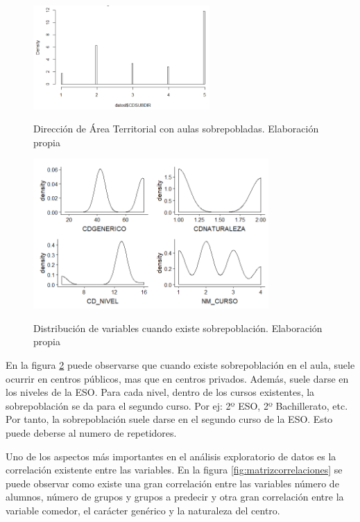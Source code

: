 \begin{figure}[htb]
	\centering
	\caption{Dirección de Área Territorial con aulas sobrepobladas. Elaboración propia}
	\includegraphics[width=0.6\textwidth]{recursos/ImagenesR/histDat}
	\label{fig:histDat}
\end{figure}
\FloatBarrier

\begin{figure}[htb]
	\centering
	\caption{Distribución de variables cuando existe sobrepoblación. Elaboración propia}
	\includegraphics[width=0.8\textwidth]{recursos/ImagenesR/DistSobrepoblacion}
	\label{fig:DistSobrepoblacion}
\end{figure}
\FloatBarrier

En la figura \ref{fig:DistSobrepoblacion} puede observarse que cuando existe sobrepoblación en el aula, suele ocurrir en centros públicos, mas que en centros privados. Además, suele darse en los niveles de la ESO. Para cada nivel, dentro de los cursos existentes, la sobrepoblación se da para el segundo curso. Por ej: 2º ESO, 2º Bachillerato, etc. Por tanto, la sobrepoblación suele darse en el segundo curso de la ESO. Esto puede deberse al numero de repetidores.

Uno de los aspectos más importantes en el análisis exploratorio de datos es la correlación existente entre las variables. En la figura \ref{fig:matrizcorrelaciones} se puede observar como existe una gran correlación entre las variables número de alumnos, número de grupos y grupos a predecir y otra gran correlación entre la variable comedor, el carácter genérico y la naturaleza del centro. 

